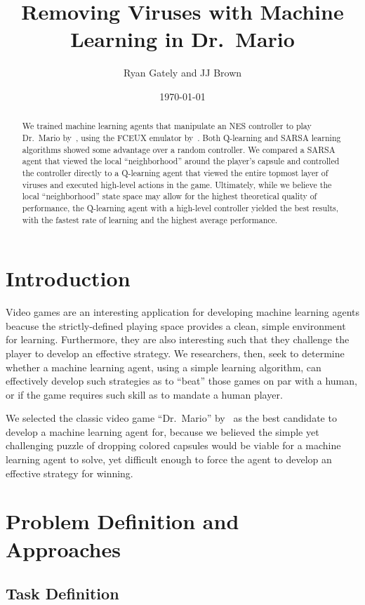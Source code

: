 \documentclass[letterpaper]{article} %
\author{Ryan Gately and JJ Brown}
\date{\today}
\title{Removing Viruses with Machine Learning in Dr.~Mario}
\begin{document}
\maketitle

\begin{abstract}
We trained machine learning agents that manipulate an NES controller to play Dr.~Mario by~\cite{drmario90}, using the FCEUX emulator by~\cite{fceux18}.
Both Q-learning and SARSA learning algorithms showed some advantage over a random controller.
We compared a SARSA agent that viewed the local ``neighborhood'' around the player's capsule and controlled the controller directly to a Q-learning agent that viewed the entire topmost layer of viruses and executed high-level actions in the game. Ultimately, while we believe the local ``neighborhood'' state space may allow for the highest theoretical quality of performance, the Q-learning agent with a high-level controller yielded the best results, with the fastest rate of learning and the highest average performance.
\end{abstract}

\section{Introduction}
Video games are an interesting application for developing machine learning agents beacuse the strictly-defined playing space provides a clean, simple environment for learning. Furthermore, they are also interesting such that they challenge the player to develop an effective strategy. We researchers, then, seek to determine whether a machine learning agent, using a simple learning algorithm, can effectively develop such strategies as to ``beat'' those games on par with a human, or if the game requires such skill as to mandate a human player.

We selected the classic video game ``Dr.~Mario'' by~\cite{drmario90} as the best candidate to develop a machine learning agent for, because we believed the simple yet challenging puzzle of dropping colored capsules would be viable for a machine learning agent to solve, yet difficult enough to force the agent to develop an effective strategy for winning.


\section{Problem Definition and Approaches}
\subsection{Task Definition}
\end{document}
